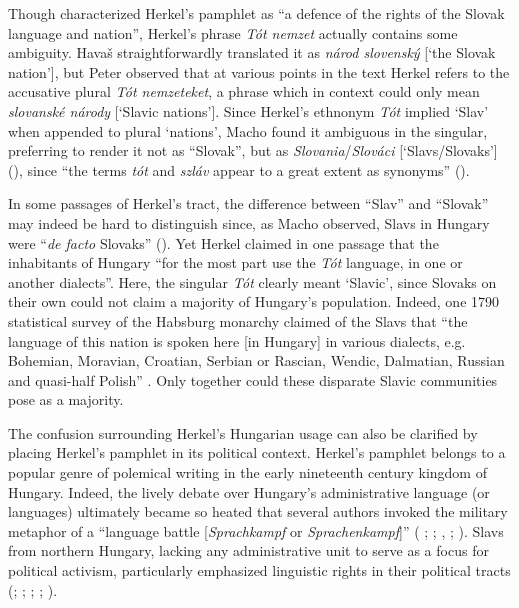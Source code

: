 Though \citet[225]{matovcik_neznama_1969} characterized Herkel’s pamphlet as “a defence of the rights of the Slovak language and nation”, Herkel’s phrase \textit{Tót nemzet} actually contains some ambiguity. Havaš straightforwardly translated it as \textit{národ slovenský} [‘the Slovak nation’], but Peter \citet[612]{macho_k_2001} observed that at various points in the text Herkel refers to the accusative plural \textit{Tót nemzeteket}, a phrase which in context could only mean \textit{slovanské národy} [‘Slavic nations’]. Since Herkel’s ethnonym \textit{Tót} implied ‘Slav’ when appended to plural ‘nations’, Macho found it ambiguous in the singular, preferring to render it not as “Slovak”, but as \textit{Slovania}/\textit{Slováci} [‘Slavs/Slovaks’] (\citeyear[617]{macho_k_2001}), since “the terms \textit{tót} and \textit{szláv} appear to a great extent as synonyms” (\citeyear[615]{macho_k_2001}).

In some passages of Herkel’s tract, the difference between “Slav” and “Slovak” may indeed be hard to distinguish since, as Macho observed, Slavs in Hungary were “\textit{de facto} Slovaks” (\citeyear[616]{macho_k_2001}). Yet Herkel claimed in one passage that the inhabitants of Hungary “for the most part use the \textit{Tót} language, in one or another dialects”. Here, the singular \textit{Tót} clearly meant ‘Slavic’, since Slovaks on their own could not claim a majority of Hungary’s population. Indeed, one 1790 statistical survey of the Habsburg monarchy claimed of the Slavs that “the language of this nation is spoken here [in Hungary] in various dialects, e.g. Bohemian, Moravian, Croatian, Serbian or Rascian, Wendic, Dalmatian, Russian and quasi-half Polish” \citep[380]{grellman_statistische_1795}. Only together could these disparate Slavic communities pose as a majority.

The confusion surrounding Herkel’s Hungarian usage can also be clarified by placing Herkel’s pamphlet in its political context. Herkel’s pamphlet belongs to a popular genre of polemical writing in the early nineteenth century kingdom of Hungary. Indeed, the lively debate over Hungary’s administrative language (or languages) ultimately became so heated that several authors invoked the military metaphor of a “language battle [\textit{Sprachkampf} or \textit{Sprachenkampf}]” (\citeauthor{thomasek_sprachkampf_1841} \citeyear{thomasek_sprachkampf_1841}; \citeauthor{bekesy_nyelvbeke_1843} \citeyear{bekesy_nyelvbeke_1843}; \citeauthor{roth_sprachkampf_1842} \citeyear{roth_sprachkampf_1842}, \citeyear{roth_sprachkampf_1847}; \citeauthor{stur_sprachenkampf_1843} \citeyear[1070--1092; 1077--1078, 1088--1090; 1800--1802]{stur_sprachenkampf_1843}). Slavs from northern Hungary, lacking any administrative unit to serve as a focus for political activism, particularly emphasized linguistic rights in their political tracts (\cite[552--558]{kollar_etwas_1821}; \cite{hoitsy_sollen_1833, hoitsy_apologie_1843}; \cite{suhajda_magyarismus_1834}; \cite{stur_beschwerden_1843, stur_neunzehnte_1845}; \cite{hodza_slowak_1848}).

